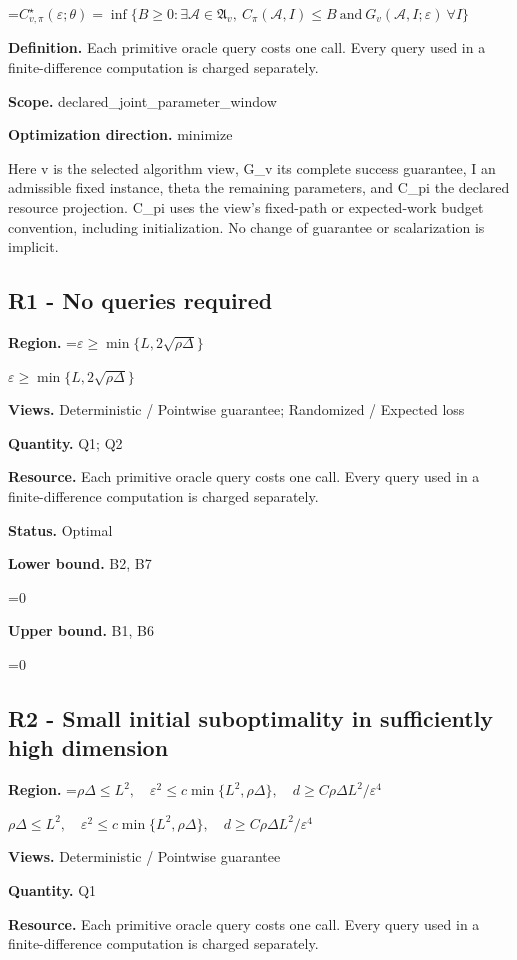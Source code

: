 \documentclass[10pt,a4paper]{article}
\newcommand{\AtlasMath}[1]{\par\begingroup\centering\setbox0=\hbox{$\displaystyle #1$}\ifdim\wd0>1.4\linewidth\typeout{ATLAS WIDE FORMULA: \the\wd0}\fi\ifdim\wd0>\linewidth\resizebox{\linewidth}{!}{\box0}\else\box0\fi\par\endgroup}
\newcommand{\AtlasInlineMath}[1]{\begingroup\setbox0=\hbox{$#1$}\ifdim\wd0>.4\linewidth\endgroup\AtlasMath{#1}\else\endgroup$#1$\fi}
\begin{document}
\AtlasMath{C^\star_{v,\pi}(\varepsilon;\theta)=\inf\{B\ge0:\exists\mathcal A\in\mathfrak A_v,\ C_\pi(\mathcal A,I)\le B\ \text{and}\ G_v(\mathcal A,I;\varepsilon)\ \forall I\}}
\textbf{Definition.} Each primitive oracle query costs one call. Every query used in a finite-difference computation is charged separately.

\textbf{Scope.} declared\_joint\_parameter\_window

\textbf{Optimization direction.} minimize

Here v is the selected algorithm view, G\_v its complete success guarantee, I an admissible fixed instance, theta the remaining parameters, and C\_pi the declared resource projection. C\_pi uses the view's fixed-path or expected-work budget convention, including initialization. No change of guarantee or scalarization is implicit.

\subsection{R1 - No queries required}
\textbf{Region.} \AtlasInlineMath{\varepsilon\ge\min\{L,2\sqrt{\rho\Delta}\}}

\textbf{Views.} Deterministic / Pointwise guarantee; Randomized / Expected loss

\textbf{Quantity.} Q1; Q2

\textbf{Resource.} Each primitive oracle query costs one call. Every query used in a finite-difference computation is charged separately.

\textbf{Status.} Optimal

\textbf{Lower bound.} B2, B7

\AtlasMath{0}
\textbf{Upper bound.} B1, B6

\AtlasMath{0}
\subsection{R2 - Small initial suboptimality in sufficiently high dimension}
\textbf{Region.} \AtlasInlineMath{\rho\Delta\le L^2,\quad\varepsilon^2\le c\min\{L^2,\rho\Delta\},\quad d\ge C\rho\Delta L^2/\varepsilon^4}

\textbf{Views.} Deterministic / Pointwise guarantee

\textbf{Quantity.} Q1

\textbf{Resource.} Each primitive oracle query costs one call. Every query used in a finite-difference computation is charged separately.
\end{document}
